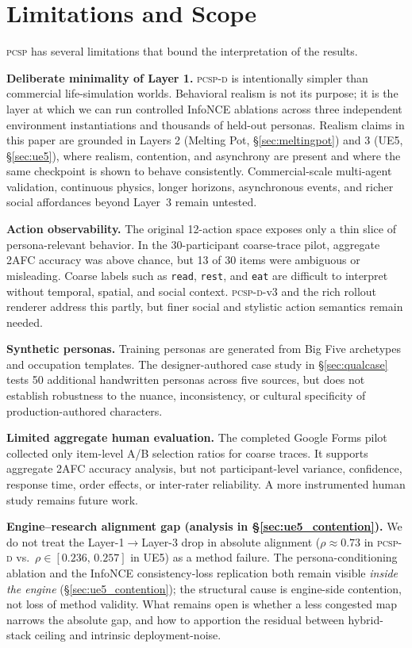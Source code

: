 \documentclass[conference]{IEEEtran}
\newcommand{\PCSP}{\textsc{pcsp}\xspace}
\newcommand{\PCSPD}{\textsc{pcsp-d}\xspace}
\begin{document}
\section{Limitations and Scope}
\label{sec:limits}

\PCSP has several limitations that bound the interpretation of the results.

\textbf{Deliberate minimality of Layer 1.}
\PCSPD{} is intentionally simpler than commercial life-simulation worlds.
Behavioral realism is not its purpose; it is the layer at which we can run
controlled InfoNCE ablations across three independent environment
instantiations and thousands of held-out personas. Realism claims in this
paper are grounded in Layers 2 (Melting Pot, \S\ref{sec:meltingpot}) and 3
(UE5, \S\ref{sec:ue5}), where realism, contention, and asynchrony are present
and where the same checkpoint is shown to behave consistently. Commercial-scale
multi-agent validation, continuous physics, longer horizons, asynchronous
events, and richer social affordances beyond Layer~3 remain untested.

\textbf{Action observability.}
The original 12-action space exposes only a thin slice of persona-relevant
behavior. In the 30-participant coarse-trace pilot, aggregate 2AFC accuracy was
above chance, but 13 of 30 items were ambiguous or misleading. Coarse labels
such as \texttt{read}, \texttt{rest}, and \texttt{eat} are difficult to
interpret without temporal, spatial, and social context. \PCSPD-v3 and the
rich rollout renderer address this partly, but finer social and stylistic
action semantics remain needed.

\textbf{Synthetic personas.}
Training personas are generated from Big Five archetypes and occupation
templates. The designer-authored case study in \S\ref{sec:qualcase} tests 50
additional handwritten personas across five sources, but does not establish
robustness to the nuance, inconsistency, or cultural specificity of
production-authored characters.

\textbf{Limited aggregate human evaluation.}
The completed Google Forms pilot collected only item-level A/B selection ratios
for coarse traces. It supports aggregate 2AFC accuracy analysis, but not
participant-level variance, confidence, response time, order effects, or
inter-rater reliability. A more instrumented human study remains future work.

\textbf{Engine--research alignment gap (analysis in
\S\ref{sec:ue5_contention}).}
We do not treat the Layer-1$\to$Layer-3 drop in absolute alignment
($\rho \approx 0.73$ in \PCSPD{} vs.\ $\rho \in [0.236,\,0.257]$ in UE5) as a
method failure. The persona-conditioning ablation and the InfoNCE
consistency-loss replication both remain visible \emph{inside the engine}
(\S\ref{sec:ue5_contention}); the structural cause is engine-side contention,
not loss of method validity. What remains open is whether a less congested
map narrows the absolute gap, and how to apportion the residual between
hybrid-stack ceiling and intrinsic deployment-noise.
\end{document}
